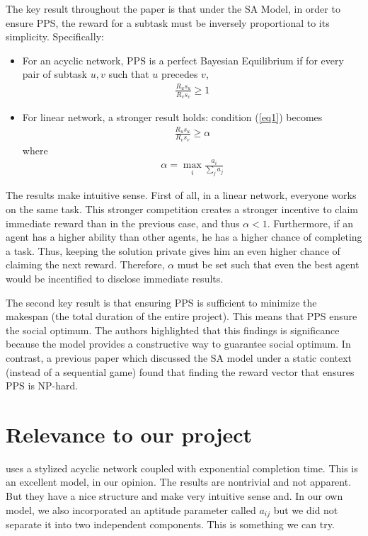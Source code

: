 \documentclass[a4paper,10pt]{article}
\theoremstyle{definition}
\begin{document}
	The key result throughout the paper is that under the SA Model, in order to ensure PPS, the reward for a subtask must be inversely proportional to its simplicity. Specifically:
	\begin{itemize}
		\item For an acyclic network, PPS is a perfect Bayesian Equilibrium if for every pair of subtask $u, v$ such that $u$ precedes $v$, 
		\begin{align}\label{eq1}
			\frac{R_us_u}{R_vs_v} \geq 1
		\end{align}	
		\item For linear network, a stronger result holds: condition (\ref{eq1}) becomes
		\begin{align}
			\frac{R_us_u}{R_vs_v} \geq \alpha
		\end{align}
		where
		\begin{align*}
			\alpha = \max_{i} \frac{a_i}{\sum_j a_j}
		\end{align*}
	\end{itemize}
	The results make intuitive sense. First of all, in a linear network, everyone works on the same task. This stronger competition creates a stronger incentive to claim immediate reward than in the previous case, and thus $\alpha < 1$. Furthermore, if an agent has a higher ability than other agents, he has a higher chance of completing a task. Thus, keeping the solution private gives him an even higher chance of claiming the next reward. Therefore, $\alpha$ must be set such that even the best agent would be incentified to disclose immediate results.
	
	The second key result is that ensuring PPS is sufficient to minimize the makespan (the total duration of the entire project). This means that PPS ensure the social optimum. The authors highlighted that this findings is significance because the model provides a constructive way to guarantee social optimum. In contrast, a previous paper which discussed the SA model under a static context (instead of a sequential game) found that finding the reward vector that ensures PPS is NP-hard. 

\section{Relevance to our project}
	\cite{Banerjee2014} uses a stylized acyclic network coupled with exponential completion time. This is an excellent model, in our opinion. The results are nontrivial and not apparent. But they have a nice structure and make very intuitive sense and. In our own model, we also incorporated an aptitude parameter called $a_{ij}$ but we did not separate it into two independent components. This is something we can try.
	
\end{document}
